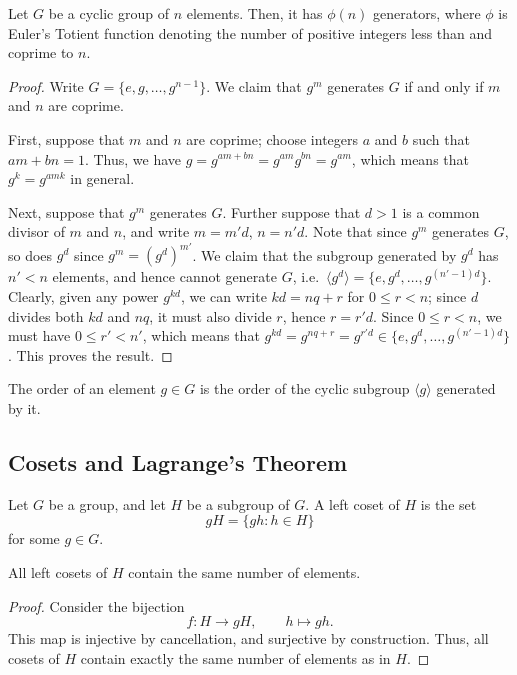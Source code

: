 \documentclass[11pt]{article}
\theoremstyle{definition}
\theoremstyle{remark}
\numberwithin{equation}{section}
\begin{document}
    \begin{lemma}
        Let $G$ be a cyclic group of $n$ elements. Then, it has $\phi(n)$
        generators, where $\phi$ is Euler's Totient function denoting the number
        of positive integers less than and coprime to $n$.
    \end{lemma}
    \begin{proof}
        Write $G = \{e, g, \dots, g^{n - 1}\}$. We claim that $g^m$ generates $G$ if
        and only if $m$ and $n$ are coprime.

        First, suppose that $m$ and $n$ are coprime; choose integers $a$ and $b$ such
        that $am + bn = 1$. Thus, we have $g = g^{am + bn} = g^{am} g^{bn} = g^{am}$,
        which means that $g^k = g^{amk}$ in general.

        Next, suppose that $g^m$ generates $G$. Further suppose that $d > 1$ is a
        common divisor of $m$ and $n$, and write $m = m'd$, $n = n'd$. Note that
        since $g^m$ generates $G$, so does $g^d$ since $g^m = (g^{d})^{m'}$.  We
        claim that the subgroup generated by $g^d$ has $n' < n$ elements, and hence
        cannot generate $G$, i.e.\ $\langle g^d\rangle = \{e, g^d, \dots, g^{(n' -
        1)d}\}$. Clearly, given any power $g^{kd}$, we can write $kd = nq + r$ for $0
        \leq r < n$; since $d$ divides both $kd$ and $nq$, it must also divide $r$,
        hence $r = r'd$. Since $0 \leq r < n$, we must have $0 \leq r' < n'$, which
        means that $g^{kd} = g^{nq + r} = g^{r'd} \in \{e, g^d, \dots, g^{(n' -
        1)d}\}$. This proves the result.
    \end{proof}

    \begin{lemma}
        The order of an element $g \in G$ is the order of the cyclic subgroup
        $\langle g\rangle$ generated by it.
    \end{lemma}

    \subsection{Cosets and Lagrange's Theorem}

    \begin{definition}
        Let $G$ be a group, and let $H$ be a subgroup of $G$. A left coset of $H$ is
        the set \[
            gH = \{gh : h \in H\}
        \] for some $g \in G$.
    \end{definition}

    \begin{lemma}
        All left cosets of $H$ contain the same number of elements.
    \end{lemma}
    \begin{proof}
        Consider the bijection \[
            f\colon H \to gH, \qquad h \mapsto gh.
        \] This map is injective by cancellation, and surjective by construction.
        Thus, all cosets of $H$ contain exactly the same number of elements as in
        $H$.
    \end{proof}
\end{document}
